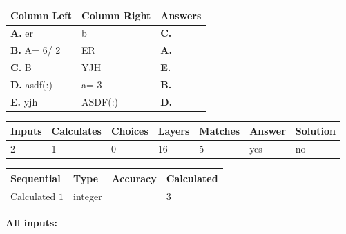 \documentclass[12pt]{article}
\begin{document}
  
\begin{tabular}{|l|l|l|}
 \hline
 Column Left & Column Right  & Answers       \\ 
 \hline
{\textbf{\large{
A.}}}
er
  & 
b
 & 
{\textbf{\large{
C.}}}
 \\ 
 \hline
{\textbf{\large{
B.}}}
 A= %
6/ %
2

  & 
ER
 & 
{\textbf{\large{
A.}}}
 \\ 
 \hline
{\textbf{\large{
C.}}}
B
  & 
YJH
 & 
{\textbf{\large{
E.}}}
 \\ 
 \hline
{\textbf{\large{
D.}}}
asdf(:)
  & 
 a= %
3
 & 
{\textbf{\large{
B.}}}
 \\ 
 \hline
{\textbf{\large{
E.}}}
yjh
  & 
ASDF(:)
 & 
{\textbf{\large{
D.}}}
 \\ 
 \hline
 \end{tabular}
  
  
 
 
\noindent{}
 
 
 
   
   
   
   
\noindent\begin{tabular}{|l|l|l|l|l|l|l|}
 \hline
Inputs & Calculates & Choices & Layers & Matches & Answer & Solution \\ \hline
           2 & 
           1 & 
           0
  & 
          16 & 
           5 & 
  yes & 
  no 
  \\ \hline
 \end{tabular}
   
   
   
   
\noindent{}
   
   
  
  
\noindent\begin{tabular}{|l|l|l|l|}
\hline
 Sequential & Type & Accuracy & Calculated \\ 
\hline
 
 
  Calculated $           1$ & integer &  & 
  $ 3 $ 
 \\  \hline  
 \end{tabular}
   
   
   
   
\noindent\vspace{0.1in}\hspace{-0.08in} {\textbf{\Large{All inputs: }}}
   
\end{document}
